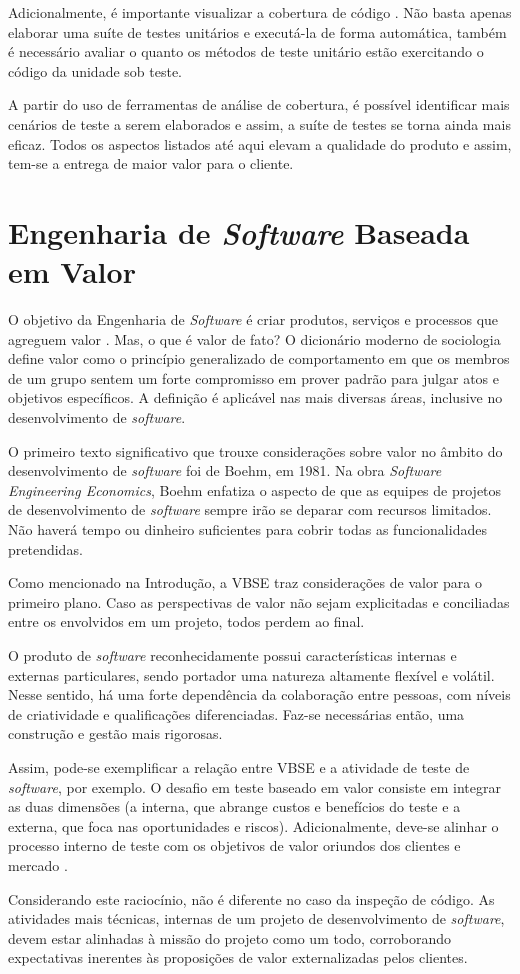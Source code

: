 Adicionalmente, é importante visualizar a cobertura de código \cite{cobertura}. Não basta apenas elaborar uma suíte de testes unitários e executá-la de forma automática, também é necessário avaliar o quanto os métodos de teste unitário estão exercitando o código da unidade sob teste.

A partir do uso de ferramentas de análise de cobertura, é possível identificar mais cenários de teste a serem elaborados e assim, a suíte de testes se torna ainda mais eficaz. Todos os aspectos listados até aqui elevam a qualidade do produto e assim, tem-se a entrega de maior valor para o cliente.

\section {Engenharia de \textit{Software} Baseada em Valor}

O objetivo da Engenharia de \textit{Software} é criar produtos, serviços e processos que agreguem valor \cite{vbse1}. Mas, o que é valor de fato? O dicionário moderno de sociologia define valor como o princípio generalizado de comportamento em que os membros de um grupo sentem um forte compromisso em prover padrão para julgar atos e objetivos específicos. A definição é aplicável nas mais diversas áreas, inclusive no desenvolvimento de \textit{software}.

O primeiro texto significativo que trouxe considerações sobre valor no âmbito do desenvolvimento de \textit{software} foi de Boehm, em 1981. Na obra \textit{Software Engineering Economics}, Boehm enfatiza o aspecto de que as equipes de projetos de desenvolvimento de \textit{software} sempre irão se deparar com recursos limitados. Não haverá tempo ou dinheiro suficientes para cobrir todas as funcionalidades pretendidas.

Como mencionado na Introdução, a VBSE traz considerações de valor para o primeiro plano. Caso as perspectivas de valor não sejam explicitadas e conciliadas entre os envolvidos em um projeto, todos perdem ao final.

O produto de \textit{software} reconhecidamente possui características internas e externas particulares, sendo portador uma natureza altamente flexível e volátil. Nesse sentido, há uma forte dependência da colaboração entre pessoas, com níveis de criatividade e qualificações diferenciadas. Faz-se necessárias então, uma construção e gestão mais rigorosas.

Assim, pode-se exemplificar a relação entre VBSE e a atividade de teste de \textit{software}, por exemplo. O desafio em teste baseado em valor consiste em integrar as duas dimensões (a interna, que abrange custos e benefícios do teste e a externa, que foca nas oportunidades e riscos). Adicionalmente, deve-se  alinhar o processo interno de teste com os objetivos de valor oriundos dos clientes e mercado \cite{vbse1}.

Considerando este raciocínio, não é diferente no caso da inspeção de código. As atividades mais técnicas, internas de um projeto de desenvolvimento de \textit{software}, devem estar alinhadas à missão do projeto como um todo, corroborando expectativas inerentes às proposições de valor externalizadas pelos clientes.